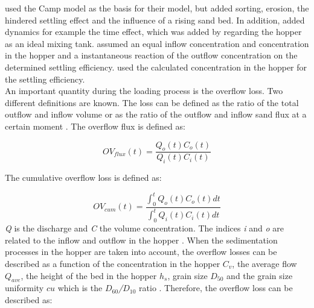 \noindent \cite{Miedema_Vlasblom} used the Camp model as the basis for their model, but added sorting, erosion, the hindered settling effect and the influence of a rising sand bed. In addition, \cite{Ooijens} added dynamics for example the time effect, which was added by regarding the hopper as an ideal mixing tank. \cite{Miedema_Vlasblom} assumed an equal inflow concentration and concentration in the hopper and a instantaneous reaction of the outflow concentration on the determined settling efficiency. \cite{Ooijens} used the calculated concentration in the hopper for the settling efficiency. \\
\noindent An important quantity during the loading process is the overflow loss. Two different definitions are known. The loss can be defined as the ratio of the total outflow and inflow volume or as the ratio of the outflow and inflow sand flux at a certain moment \citep{Rhee}.\newline \newline
The overflow flux is defined as:

\begin{equation}
\label{eq:OV_flux}
    OV_{flux}(t) = \frac{Q_o(t) C_o(t)}{Q_i(t) C_i(t)}
\end{equation}


\noindent The cumulative overflow loss is defined as:

\begin{equation}
\label{eq:OV_cum}
    OV_{cum}(t) = \frac{\int_{0}^{t} Q_o(t) C_o(t) dt}{\int_{0}^{t} Q_i(t) C_i(t) dt}
\end{equation}
\newline
\noindent \textit{Q} is the discharge and \textit{C} the volume concentration. The indices \textit{i} and \textit{o} are related to the inflow and outflow in the hopper \citep{Rhee}. When the sedimentation processes in the hopper are taken into account, the overflow losses can be described as a function of the concentration in the hopper \textit{$C_v$}, the average flow \textit{$Q_{ave}$}, the height of the bed in the hopper \textit{$h_s$}, grain size \textit{$D_{50}$} and the grain size uniformity \textit{$cu$} which is the \textit{$D_{60}$/$D_{10}$} ratio \citep{Ooijens}. Therefore, the overflow loss can be described as:


